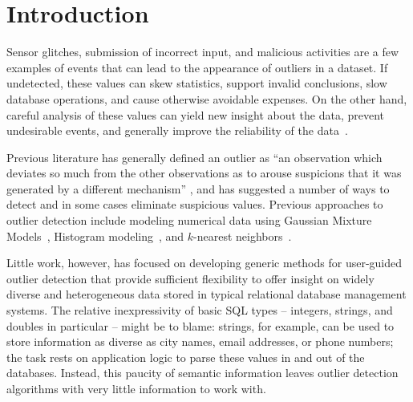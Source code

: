 \section{Introduction}
\label{sec:intro}

Sensor glitches, submission of incorrect input, and malicious activities are a few examples of events that can lead to the appearance of outliers in a dataset. If undetected, these values can skew statistics, support invalid conclusions, slow database operations, and cause otherwise avoidable expenses. On the other hand, careful analysis of these values can yield new insight about the data, prevent undesirable events, and generally improve the reliability of the data~\cite{Achour2014}.

Previous literature has generally defined an outlier as ``an observation which deviates so much from the other observations as to arouse suspicions that it was generated by a different mechanism'' \cite{Hawkins1980}, and has suggested a number of ways to detect and in some cases eliminate suspicious values. Previous approaches to outlier detection include modeling numerical data using Gaussian Mixture Models~\cite{Lu2005,Roberts1994,Roberts1999}, Histogram modeling~\cite{Gebski2007,Sheng2007}, and $k$-nearest neighbors~\cite{Ramaswamy2000}.

Little work, however, has focused on developing generic methods for user-guided outlier detection that provide sufficient flexibility to offer insight on widely diverse and heterogeneous data stored in typical relational database management systems. The relative inexpressivity of basic SQL types -- integers, strings, and doubles in particular -- might be to blame: strings, for example, can be used to store information as diverse as city names, email addresses, or phone numbers; the task rests on application logic to parse these values in and out of the databases. Instead, this paucity of semantic information leaves outlier detection algorithms with very little information to work with.

